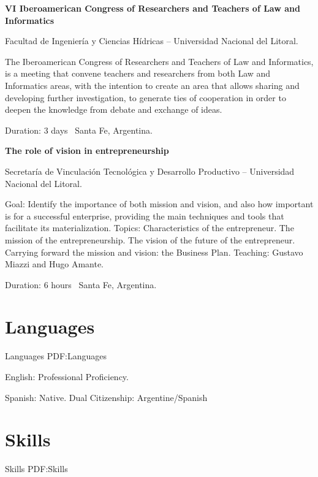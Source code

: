 \documentclass[letterpaper,MMMyyyy,nonstop]{simpleresumecv}
\begin{document}
\begin{body}
\BigGap
\textbf{VI Iberoamerican Congress of Researchers and Teachers of Law and Informatics}
\hfill
{}

\BulletItem Facultad de Ingeniería y Ciencias Hídricas – Universidad Nacional del Litoral.
\begin{detail}
	\SubBulletItem
	The Iberoamerican Congress of Researchers and Teachers of Law and Informatics, is a meeting that convene teachers and researchers from both Law and Informatics areas, with the intention to create an area that allows sharing and developing further investigation, to generate ties of cooperation in order to deepen the knowledge from debate and exchange of ideas.
\end{detail}
Duration: 3 days \SubBulletSymbol\, Santa Fe, Argentina.

\BigGap
\textbf{The role of vision in entrepreneurship}
\hfill
{}

\BulletItem Secretaría de Vinculación Tecnológica y Desarrollo Productivo – Universidad Nacional del Litoral.
\begin{detail}
	\SubBulletItem
	Goal: Identify the importance of both mission and vision, and also how important is for a successful enterprise, providing the main techniques and tools that facilitate its materialization.
	\SubBulletItem
	Topics: Characteristics of the entrepreneur. The mission of the entrepreneurship. The vision of the future of the entrepreneur. Carrying forward the mission and vision: the Business Plan.
	\SubBulletItem
	Teaching: Gustavo Miazzi and Hugo Amante. 
\end{detail}
Duration: 6 hours \SubBulletSymbol\, Santa Fe, Argentina.


\section
{Languages}
{Languages}
{PDF:Languages}

\BulletItem
English: Professional Proficiency.

\GapNoBreak
\BulletItem
Spanish: Native.
\GapNoBreak
\BulletItem
Dual Citizenship: Argentine/Spanish


\section
{Skills}
{Skills}
{PDF:Skills}


\end{body}
\end{document}

